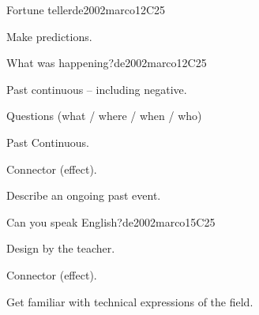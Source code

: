 \begin{syllabus}
\begin{unit}{Fortune teller}{}{de2002marco}{12}{C25}
   \begin{learningoutcomes}
      \item Make predictions.
   \end{learningoutcomes}
\end{unit}

\begin{unit}{What was happening?}{}{de2002marco}{12}{C25}
   \begin{topics}
      \item Past continuous – including negative.
      \item Questions (what / where / when / who)
      \item Past Continuous.
      \item Connector (effect).
   \end{topics}

   \begin{learningoutcomes}
      \item Describe an ongoing past event.
   \end{learningoutcomes}
\end{unit}

\begin{unit}{Can you speak English?}{}{de2002marco}{15}{C25}
   \begin{topics}
      \item Design by the teacher.
      \item Connector (effect).
   \end{topics}

   \begin{learningoutcomes}
      \item Get familiar with technical expressions of the field.
   \end{learningoutcomes}
\end{unit}

\begin{coursebibliography}
\end{coursebibliography}

\end{syllabus}
%

